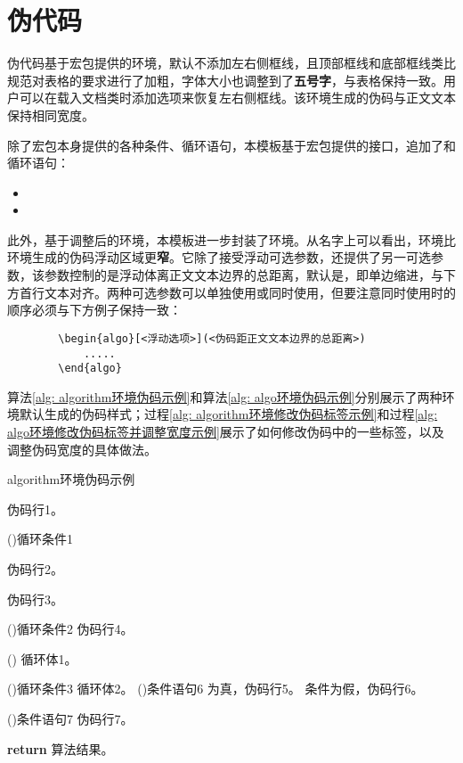 \documentclass[print, doctor, vlined]{DissertUESTC}
\begin{document}
	\clearpage
	\section{伪代码}
	
	伪代码基于宏包提供的环境，默认不添加左右侧框线，且顶部框线和底部框线类比规范对表格的要求进行了加粗，字体大小也调整到了\textbf{五号字}，与表格保持一致。用户可以在载入文档类时添加选项来恢复左右侧框线。该环境生成的伪码与正文文本保持相同宽度。
	
	除了宏包本身提供的各种条件、循环语句，本模板基于宏包提供的接口，追加了和循环语句：
	\begin{itemize}
		\item {}
		\item {}
	\end{itemize}
	
	
	此外，基于调整后的环境，本模板进一步封装了环境。从名字上可以看出，环境比环境生成的伪码浮动区域更\textbf{窄}。它除了接受浮动可选参数\shad{[htbp]}，还提供了另一可选参数，该参数控制的是浮动体离正文文本边界的总距离，默认是\shad{4em}，即单边缩进\shad{2em}，与下方首行文本对齐。两种可选参数可以单独使用或同时使用，但要注意同时使用时的顺序必须与下方例子保持一致：
	
	\begin{verbatim}
		\begin{algo}[<浮动选项>](<伪码距正文文本边界的总距离>)
		    .....
		\end{algo}
	\end{verbatim}
	
	算法\ref{alg: algorithm环境伪码示例}和算法\ref{alg: algo环境伪码示例}分别展示了两种环境默认生成的伪码样式；过程\ref{alg: algorithm环境修改伪码标签示例}和过程\ref{alg: algo环境修改伪码标签并调整宽度示例}展示了如何修改伪码中的一些标签，以及调整伪码宽度的具体做法。

	
	\begin{algorithm}[!h]
		\caption{algorithm环境伪码示例} \label{alg: algorithm环境伪码示例}
		伪码行1。
		
		\For(){循环条件1}{
			伪码行2。
			
			伪码行3。
			
			\DoWhile(){循环条件2}{
				伪码行4。
			}
			
			\Loop(){
				循环体1。
			}
			
			\Repeat(){循环条件3}{
				循环体2。
			}
			\eIf(){条件语句6}{
				为真，伪码行5。
			}{
				条件为假，伪码行6。
			}
			
			\If(){条件语句7}{
				伪码行7。
			}
		}
		\textbf{return} 算法结果。
	\end{algorithm}
	
\end{document}

